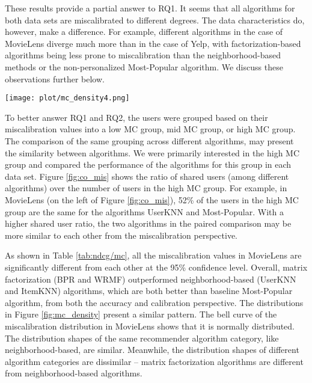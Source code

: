 These results provide a partial answer to RQ1. It seems that all algorithms for both data sets are miscalibrated to different degrees. The data characteristics do, however, make a difference. For example, different algorithms in the case of MovieLens diverge much more than in the case of Yelp, with factorization-based algorithms being less prone to miscalibration than the neighborhood-based methods or the non-personalized Most-Popular algorithm. We discuss these observations further below.

\begin{figure*}[!hbtp]
    \texttt{[image: plot/mc\_density4.png]}
    \caption{Miscalibration density plots of two data sets. The left is MovieLens, and the right is Yelp.}
    \label{fig:mc_density}
\end{figure*}



To better answer RQ1 and RQ2, the users were grouped based on their miscalibration values into a low MC group, mid MC group, or high MC group. The comparison of the same grouping across different algorithms, may present the similarity between algorithms. We were primarily interested in the high MC group and compared the performance of the algorithms for this group in each data set. Figure \ref{fig:co_mis} shows the ratio of shared users (among different algorithms) over the number of users in the high MC group. For example, in MovieLens (on the left of Figure \ref{fig:co_mis}), 52\% of the users in the high MC group are the same for the algorithms UserKNN and Most-Popular. With a higher shared user ratio, the two algorithms in the paired comparison may be more similar to each other from the miscalibration perspective.





As shown in Table \ref{tab:ndcg/mc}, all the miscalibration values in MovieLens are significantly different from each other at the 95\% confidence level. Overall, matrix factorization (BPR and WRMF) outperformed neighborhood-based (UserKNN and ItemKNN) algorithms, which are both better than baseline Most-Popular algorithm, from both the accuracy and calibration perspective. The distributions in Figure \ref{fig:mc_density} present a similar pattern. The bell curve of the miscalibration distribution in MovieLens shows that it is normally distributed. The distribution shapes of the same recommender algorithm category, like neighborhood-based, are similar. Meanwhile, the distribution shapes of different algorithm categories are dissimilar -- matrix factorization algorithms are different from neighborhood-based algorithms. 

